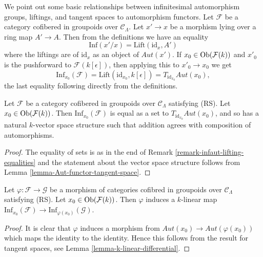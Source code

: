 \begin{remark}
\label{remark-infaut-lifting-equalities}
We point out some basic relationships between infinitesimal automorphism
groups, liftings, and tangent spaces to automorphism functors. Let
$\mathcal{F}$ be a category cofibered in groupoids over $\mathcal{C}_\Lambda$.
Let $x' \to x$ be a morphism lying over a ring map $A' \to A$.
Then from the definitions we have an equality
$$
\text{Inf}(x'/x) = \text{Lift}(\text{id}_x, A')
$$
where the liftings are of $\text{id}_x$ as an object of
$\mathit{Aut}(x')$.  If $x_0 \in \mathop{\mathrm{Ob}}\nolimits(\mathcal{F}(k))$ and $x'_0$
is the pushforward to $\mathcal{F}(k[\epsilon])$, then applying this to
$x'_0 \to x_0$ we get
$$
\text{Inf}_{x_0}(\mathcal{F}) =
\text{Lift}(\text{id}_{x_0}, k[\epsilon]) =
T_{\text{id}_{x_0}} \mathit{Aut}(x_0),
$$
the last equality following directly from the definitions.
\end{remark}

\begin{lemma}
\label{lemma-infaut-vector-space}
Let $\mathcal{F}$ be a category cofibered in groupoids over
$\mathcal{C}_\Lambda$ satisfying (RS). Let $x_0 \in \mathop{\mathrm{Ob}}\nolimits(\mathcal{F}(k))$.
Then $\text{Inf}_{x_0}(\mathcal{F})$ is equal as a set to
$T_{\text{id}_{x_0}} \mathit{Aut}(x_0)$, and so has a natural $k$-vector
space structure such that addition agrees with composition of automorphisms.
\end{lemma}

\begin{proof}
The equality of sets is as in the end of
Remark \ref{remark-infaut-lifting-equalities}
and the statement about the vector space structure follows from
Lemma \ref{lemma-Aut-functor-tangent-space}.
\end{proof}

\begin{lemma}
\label{lemma-k-linear-infaut}
Let $\varphi : \mathcal{F} \to \mathcal{G}$ be a morphism of categories
cofibred in groupoids over $\mathcal{C}_\Lambda$ satisfying (RS).
Let $x_0 \in \mathop{\mathrm{Ob}}\nolimits(\mathcal{F}(k))$. Then $\varphi$ induces a $k$-linear
map $\text{Inf}_{x_0}(\mathcal{F}) \to \text{Inf}_{\varphi(x_0)}(\mathcal{G})$.
\end{lemma}

\begin{proof}
It is clear that $\varphi$ induces a morphism from
$\mathit{Aut}(x_0) \to \mathit{Aut}(\varphi(x_0))$
which maps the identity to the identity. Hence this follows from
the result for tangent spaces, see
Lemma \ref{lemma-k-linear-differential}.
\end{proof}

